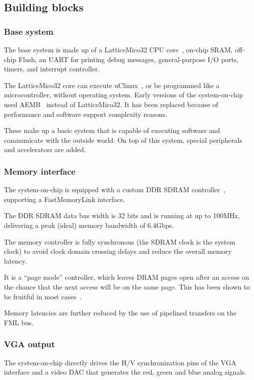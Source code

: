 \documentclass[a4paper,11pt,twocolumn]{paper}
\begin{document}
\subsection{Building blocks}
\subsubsection{Base system}
The base system is made up of a LatticeMico32 CPU core~\cite{mico32}, on-chip SRAM, off-chip Flash, an UART for printing debug messages, general-purpose I/O ports, timers, and interrupt controller.

The LatticeMico32 core can execute uClinux~\cite{micolinux}, or be programmed like a microcontroller, without operating system. Early versions of the system-on-chip used AEMB~\cite{aemb} instead of LatticeMico32. It has been replaced because of performance and software support complexity reasons.

These make up a basic system that is capable of executing software and communicate with the outside world. On top of this system, special peripherals and accelerators are added.

\subsubsection{Memory interface}
The system-on-chip is equipped with a custom DDR SDRAM controller~\cite{hpdmc}, supporting a FastMemoryLink interface.

The DDR SDRAM data bus width is 32 bits and is running at up to 100MHz, delivering a peak (ideal) memory bandwidth of 6.4Gbps.

The memory controller is fully synchronous (the SDRAM clock is the system clock) to avoid clock domain crossing delays and reduce the overall memory latency.

It is a ``page mode'' controller, which leaves DRAM pages open after an access on the chance that the next access will be on the same page. This has been shown to be fruitful in most cases~\cite{pagemode}.

Memory latencies are further reduced by the use of pipelined transfers on the FML bus.

\subsubsection{VGA output}
The system-on-chip directly drives the H/V synchronization pins of the VGA interface and a video DAC that generates the red, green and blue analog signals.
\end{document}
